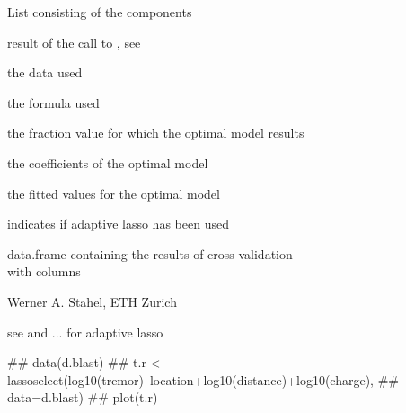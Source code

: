 \documentclass{article}
\begin{document}
\begin{Value}
List consisting of the components
\begin{ldescription}
\item[\code{lars}] result of the call to , see 
\item[\code{data}] the data used
\item[\code{formula}] the formula used
\item[\code{s}] the fraction value for which the optimal model results
\item[\code{coefficients}] the coefficients of the optimal model
\item[\code{fitted}] the fitted values for the optimal model
\item[\code{adaptive}] indicates if adaptive lasso has been used
\item[\code{cv}] data.frame containing the results of cross validation\\
with columns  
\end{ldescription}
\end{Value}
\begin{Author}\relax
Werner A. Stahel, ETH Zurich
\end{Author}
\begin{References}\relax
see  and ... for adaptive lasso
\end{References}
\begin{SeeAlso}\relax
{}
\end{SeeAlso}
\begin{Examples}
\begin{ExampleCode}
## data(d.blast)
## t.r <- lassoselect(log10(tremor)~location+log10(distance)+log10(charge),
##                    data=d.blast)
## plot(t.r)
\end{ExampleCode}
\end{Examples}
\end{document}

